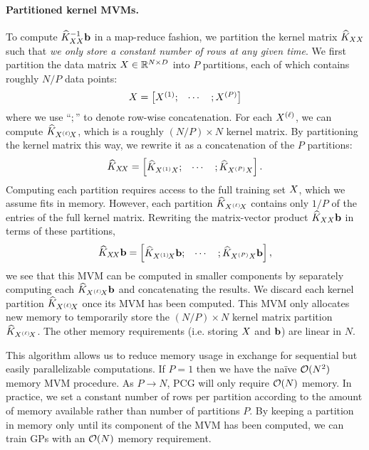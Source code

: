 \paragraph{Partitioned kernel MVMs.}
To compute $\widehat{K}_{XX}^{-1} \mathbf{b}$ in a map-reduce fashion, we partition the kernel matrix $\widehat{K}_{XX}$ such that \textit{we only store a constant number of rows at any given time}.
We first partition the data matrix $X \in \mathbb{R}^{N \times D}$ into $P$ partitions, each of which contains roughly $N/P$ data points:
%
\[
  X = \begin{bmatrix}
    X^{(1)}; &
    \cdots &
    ; X^{(P)}
  \end{bmatrix}
\]
%
where we use ``$;$'' to denote row-wise concatenation.
For each $X^{(\ell)}$, we can compute $\widehat {K}_{X^{(\ell)}\!X}$, which is a roughly $(N / P) \times N$ kernel matrix.
By partitioning the kernel matrix this way, we rewrite it as a concatenation of the $P$ partitions:
%
\[
  \widehat {K}_{X\!X} = \begin{bmatrix}
      \widehat {K}_{X^{(1)}X}; &
    \cdots &
    ; \widehat {K}_{X^{(P)}X}
  \end{bmatrix}.
\]
%
Computing each partition requires access to the full training set $X$, which we assume fits in memory.
However, each partition $\widehat {K}_{X^{(\ell)}\!X}$ contains only $1/P$ of the entries of the full kernel matrix.
Rewriting the matrix-vector product $\widehat{K}_{XX} \mathbf{b}$ in terms of these partitions,
%
\[
  \widehat {K}_{X\!X} \mathbf{b} = \begin{bmatrix}
    \widehat {K}_{X^{(1)}\!X} \mathbf{b}; &
    \cdots &
    ; \widehat {K}_{X^{(P)}X} \mathbf{b}
  \end{bmatrix},
\]
%
we see that this MVM can be computed in smaller components by separately computing each $\widehat {K}_{X^{(\ell)}\!X} \mathbf{b}$ and concatenating the results.
We discard each kernel partition $\widehat {K}_{X^{(\ell)}\!X}$ once its MVM has been computed.
This MVM only allocates new memory to temporarily store the $(N / P) \times N$ kernel matrix partition $\widehat {K}_{X^{(\ell)}\!X}$.
The other memory requirements (i.e. storing $X$ and $\mathbf{b}$) are linear in $N$.

This algorithm allows us to reduce memory usage in exchange for sequential but easily parallelizable computations.
If $P=1$ then we have the na\"ive $\bigo{N^2}$ memory MVM procedure. As $P \to N$, PCG will only require $\bigo{N}$ memory.
In practice, we set a constant number of rows per partition according to the amount of memory available rather than number of partitions $P$.
By keeping a partition in memory only until its component of the MVM has been computed, we can train GPs with an $\bigo{N}$ memory requirement.

